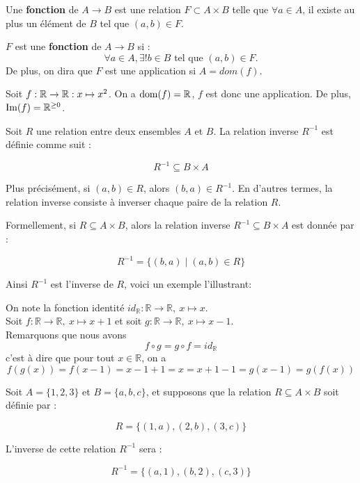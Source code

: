 \begin{definition}   

    \item Une \textbf{fonction} de \( A \to B \) est une relation \( F \subset A \times B \) telle que \( \forall a \in A \), il existe au plus un élément de \( B \) tel que \( (a, b) \in F \).  
    \item \(F \) est une \textbf{fonction} de \( A \to B \) si :
    \[
    \forall a \in A, \exists ! b \in B \text{ tel que } (a, b) \in F.
    \]
    De plus, on dira que $F$ est une application si $A=dom(f)$.
\end{definition}
Soit $f:\mathbb{R} \to \mathbb{R} :x\mapsto x^2$. On a $\operatorname{dom}(f)= \mathbb{R}$, $f$ est donc une application. De plus, $\operatorname{Im}(f)=\mathbb{ R}^{\geq 0}$.
\begin{exemple}
    
\end{exemple}


\begin{definition}
Soit \( R \) une relation entre deux ensembles \( A \) et \( B \). La relation inverse \( R^{-1} \) est définie comme suit :

\[
R^{-1} \subseteq B \times A
\]

Plus précisément, si \( (a, b) \in R \), alors \( (b, a) \in R^{-1} \). En d'autres termes, la relation inverse consiste à inverser chaque paire de la relation \( R \).

Formellement, si \( R \subseteq A \times B \), alors la relation inverse \( R^{-1} \subseteq B \times A \) est donnée par :

\[
R^{-1} = \{ (b, a) \mid (a, b) \in R \}
\]
\end{definition}
Ainsi $R^{-1}$ est l'inverse de $R$, voici un exemple l'illustrant:\\

\begin{exemple}
    On note la fonction identité $id_\mathbb{R}:\mathbb{R}\to \mathbb{R},\: x\mapsto x$. \\
Soit $f:\mathbb{R} \to \mathbb{R}, \: x\mapsto x+1 $
et soit $g: \mathbb{R \to \mathbb{R}}, \: x\mapsto x -1$.\\
Remarquons que nous avons
\[
f \circ g=g\circ f=id_{\mathbb{R}}
\]
c'est à dire que pour tout $x\in \mathbb{R}$, on a
\[
f(g(x))=f(x-1)=x-1+1=x=x+1-1=g(x-1)=g(f(x))
\]
\end{exemple}

\begin{exemple}
    Soit \( A = \{1, 2, 3\} \) et \( B = \{a, b, c\} \), et supposons que la relation \( R \subseteq A \times B \) soit définie par :

\[
R = \{(1, a), (2, b), (3, c)\}
\]

L'inverse de cette relation \( R^{-1} \) sera :

\[
R^{-1} = \{(a, 1), (b, 2), (c, 3)\}
\]
\end{exemple}


